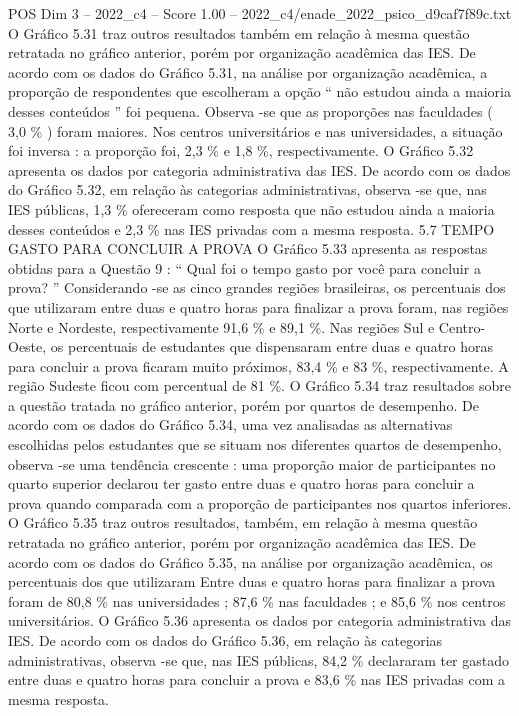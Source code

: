 \begin{textsample}{POS Dim 3 – 2022\_c4 – Score 1.00 – 2022\_c4/enade\_2022\_psico\_d9caf7f89c.txt}
O Gráfico 5.31 traz outros resultados também em relação à mesma questão retratada no gráfico anterior, porém por organização acadêmica das IES.
De acordo com os dados do Gráfico 5.31, na análise por organização acadêmica, a proporção de respondentes que escolheram a opção “ não estudou ainda a maioria desses conteúdos ” foi pequena.
Observa -se que as proporções nas faculdades ( 3,0 \% ) foram maiores.
Nos centros universitários e nas universidades, a situação foi inversa : a proporção foi, 2,3 \% e 1,8 \%, respectivamente.
O Gráfico 5.32 apresenta os dados por categoria administrativa das IES.
De acordo com os dados do Gráfico 5.32, em relação às categorias administrativas, observa -se que, nas IES públicas, 1,3 \% ofereceram como resposta que não estudou ainda a maioria desses conteúdos e 2,3 \% nas IES privadas com a mesma resposta. 5.7 TEMPO GASTO PARA CONCLUIR A PROVA O Gráfico 5.33 apresenta as respostas obtidas para a Questão 9 : “ Qual foi o tempo gasto por você para concluir a prova? ” Considerando -se as cinco grandes regiões brasileiras, os percentuais dos que utilizaram entre duas e quatro horas para finalizar a prova foram, nas regiões Norte e Nordeste, respectivamente 91,6 \% e 89,1 \%.
Nas regiões Sul e Centro-Oeste, os percentuais de estudantes que dispensaram entre duas e quatro horas para concluir a prova ficaram muito próximos, 83,4 \% e 83 \%, respectivamente.
A região Sudeste ficou com percentual de 81 \%.
O Gráfico 5.34 traz resultados sobre a questão tratada no gráfico anterior, porém por quartos de desempenho.
De acordo com os dados do Gráfico 5.34, uma vez analisadas as alternativas escolhidas pelos estudantes que se situam nos diferentes quartos de desempenho, observa -se uma tendência crescente : uma proporção maior de participantes no quarto superior declarou ter gasto entre duas e quatro horas para concluir a prova quando comparada com a proporção de participantes nos quartos inferiores.
O Gráfico 5.35 traz outros resultados, também, em relação à mesma questão retratada no gráfico anterior, porém por organização acadêmica das IES.
De acordo com os dados do Gráfico 5.35, na análise por organização acadêmica, os percentuais dos que utilizaram Entre duas e quatro horas para finalizar a prova foram de 80,8 \% nas universidades ; 87,6 \% nas faculdades ; e 85,6 \% nos centros universitários.
O Gráfico 5.36 apresenta os dados por categoria administrativa das IES.
De acordo com os dados do Gráfico 5.36, em relação às categorias administrativas, observa -se que, nas IES públicas, 84,2 \% declararam ter gastado entre duas e quatro horas para concluir a prova e 83,6 \% nas IES privadas com a mesma resposta.

\end{textsample}

